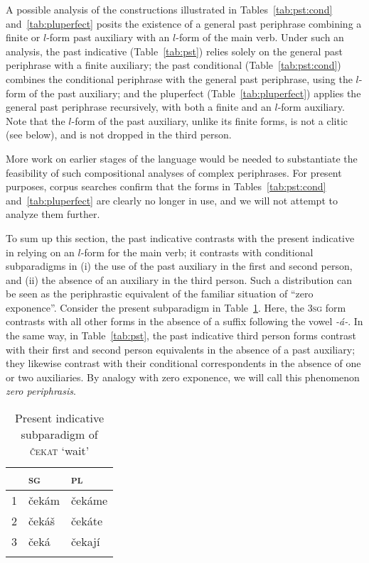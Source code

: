 \documentclass[output=paper]{langsci/langscibook}
\begin{document}
A possible analysis of the constructions illustrated in Tables~\ref{tab:pst:cond} and~\ref{tab:pluperfect} posits the existence of a general past periphrase combining a finite or $l$-form past auxiliary with an $l$-form of the main verb. Under such an analysis, the past indicative (Table~\ref{tab:pst}) relies solely on the general past periphrase with a finite auxiliary; the past conditional (Table~\ref{tab:pst:cond}) combines the conditional periphrase with the general past periphrase, using the $l$-form of the past auxiliary; and the pluperfect (Table~\ref{tab:pluperfect}) applies the general past periphrase recursively, with both a finite and an $l$-form auxiliary. Note that the $l$-form of the past auxiliary, unlike its finite  forms, is not a clitic (see below), and  is not dropped in the third person. 

More work on earlier stages of the language would be needed to substantiate the feasibility of such compositional analyses of complex periphrases. For present purposes, corpus searches confirm that the forms in Tables~\ref{tab:pst:cond} and~\ref{tab:pluperfect} are clearly no longer in use, and we will not attempt to analyze them further.

To sum up this section, the past indicative contrasts with the present indicative in relying on an $l$-form for the main verb; it contrasts with conditional subparadigms in (i) the use of the past auxiliary in the first and second person, and (ii) the absence of an auxiliary in the third person. Such a distribution can be seen as the periphrastic equivalent of the familiar situation of ``zero exponence''. Consider the present subparadigm in Table~\ref{tab:prs}. Here, the \textsc{3sg} form contrasts with all other forms in the absence of a suffix following the vowel \emph{-á-}. In the same way, in Table~\ref{tab:pst}, the past indicative third person forms contrast with their first and second person equivalents in the absence of a past auxiliary; they likewise contrast with their conditional correspondents in the absence of one or two auxiliaries. By analogy with zero exponence, we will call this phenomenon \emph{zero periphrasis}.  

\begin{table}
\begin{tabular}{lll}
\lsptoprule
& \scshape sg & \scshape pl\\
\midrule
\scshape 1 & čekám & čekáme\\ 
\scshape 2 & čekáš & čekáte\\
\scshape 3 &  čeká & čekají\\ 
\lspbottomrule
\end{tabular}
\caption{Present indicative subparadigm of \textsc{\v{c}ekat} ‘wait’\label{tab:prs}}
\end{table}
\end{document}
